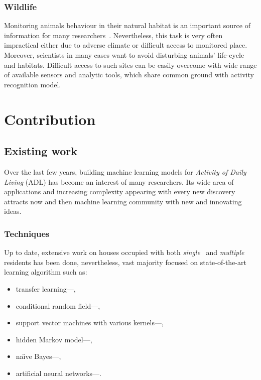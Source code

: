 \documentclass[11pt, a4paper, pdflatex, leqno, twoside, openright]{report}
\begin{document}
      \subsubsection{Wildlife}
Monitoring animals behaviour in their natural habitat is an important source of information for many researchers~\citep{Szewczyk:2004:HMS:990680.990704}. Nevertheless, this task is very often impractical either due to adverse climate or difficult access to monitored place. Moreover, scientists in many cases want to avoid disturbing animals' life-cycle and habitats. Difficult access to such sites can be easily overcome with wide range of available sensors and analytic tools, which share common ground with activity recognition model.


  \section{Contribution}
    \subsection{Existing work}
Over the last few years, building machine learning models for \emph{Activity of Daily Living} (ADL) has become an interest of many researchers. Its wide area of applications and increasing complexity appearing with every new discovery attracts now and then machine learning community with new and innovating ideas.\\

    \subsubsection{Techniques}
Up to date, extensive work on houses occupied with both \emph{single}~\citep{cook2009assessing,fatima2013unified} and \emph{multiple}~\citep{hsu2010strategies,singla2010recognizing,crandall2009coping} residents has been done, nevertheless, vast majority focused on state-of-the-art learning algorithm such as:
\begin{itemize}
\item transfer learning---\citet{cook2013transfer},
\item conditional random field---\citet{hsu2010strategies,van2010activity},
\item support vector machines with various kernels---\citet{fatima2013unified},
\item hidden Markov model---\citet{rashidi2011discovering},
\item na\"{\i}ve Bayes---\citet{cook2013activity},
\item artificial neural networks---\citet{fatima2013unified,fatima2013analysis}.
\end{itemize}
\end{document}
